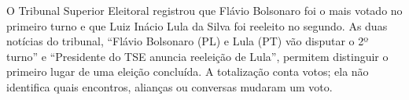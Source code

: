 O Tribunal Superior Eleitoral registrou que Flávio Bolsonaro foi o mais votado no primeiro turno e que Luiz Inácio Lula da Silva foi reeleito no segundo. As duas notícias do tribunal, \enquote{Flávio Bolsonaro (PL) e Lula (PT) vão disputar o 2º turno} e \enquote{Presidente do TSE anuncia reeleição de Lula}, permitem distinguir o primeiro lugar de uma eleição concluída. A totalização conta votos; ela não identifica quais encontros, alianças ou conversas mudaram um voto.
